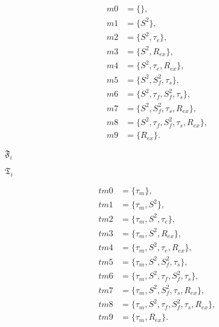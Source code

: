 \documentclass[a4paper,11pt,twoside,openright]{book}
\def\lthtmlcheckvsize{\ifdim\ht\sizebox<\vsize 
  \ifdim\wd\sizebox<\hsize\expandafter\hfill\fi \expandafter\vfill
  \else\expandafter\vss\fi}%
\begin{document}
{\newpage\clearpage
\setcounter{equation}{20}
%
\begin{subequations}\begin{align}
m0 &= \{\},\\
m1 &= \{S^2\},\\
m2 &= \{S^2, \tau_e\},\\
m3 &= \{S^2, R_{ex}\},\\
m4 &= \{S^2, \tau_e, R_{ex}\},\\
m5 &= \{S^2, S^2_f, \tau_s\},\\
m6 &= \{S^2, \tau_f, S^2_f, \tau_s\},\\
m7 &= \{S^2, S^2_f, \tau_s, R_{ex}\},\\
m8 &= \{S^2, \tau_f, S^2_f, \tau_s, R_{ex}\},\\
m9 &= \{R_{ex}\}.\end{align}\end{subequations}%
\lthtmldisplayZ
\lthtmlcheckvsize\clearpage}

{\newpage\clearpage
{}%
$ \mathfrak{F}_i$%
\lthtmlindisplaymathZ
\lthtmlcheckvsize\clearpage}

{\newpage\clearpage
{}%
$ \mathfrak{T}_i$%
\lthtmlindisplaymathZ
\lthtmlcheckvsize\clearpage}

{\newpage\clearpage
\setcounter{equation}{21}
%
\begin{subequations}\begin{align}
tm0 &= \{\tau_m\},\\
tm1 &= \{\tau_m, S^2\},\\
tm2 &= \{\tau_m, S^2, \tau_e\},\\
tm3 &= \{\tau_m, S^2, R_{ex}\},\\
tm4 &= \{\tau_m, S^2, \tau_e, R_{ex}\},\\
tm5 &= \{\tau_m, S^2, S^2_f, \tau_s\},\\
tm6 &= \{\tau_m, S^2, \tau_f, S^2_f, \tau_s\},\\
tm7 &= \{\tau_m, S^2, S^2_f, \tau_s, R_{ex}\},\\
tm8 &= \{\tau_m, S^2, \tau_f, S^2_f, \tau_s, R_{ex}\},\\
tm9 &= \{\tau_m, R_{ex}\}.\end{align}\end{subequations}%
\lthtmldisplayZ
\lthtmlcheckvsize\clearpage}
\end{document}

